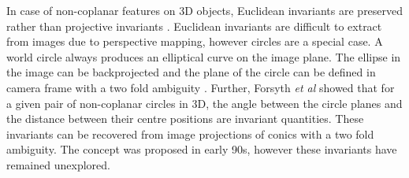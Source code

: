 \documentclass{bmvc2k}
\def\etal{\emph{et al}\bmvaOneDot}
\begin{document}
\par 
In case of non-coplanar features on 3D objects, Euclidean invariants are preserved rather than projective invariants \cite{forsyth_91}.
Euclidean invariants are difficult to extract from images due to perspective mapping, however circles are a special case.   
A world circle always produces an elliptical curve on the image plane. 
The ellipse in the image can be backprojected and the plane of the circle can be defined in camera frame with a two fold ambiguity \cite{forsyth_91,safaee-rad_three-dimensional_1992}. 
Further, Forsyth \etal \cite{forsyth_91} showed that for a given pair of non-coplanar circles in 3D, the angle between the circle planes and the distance between their centre positions are invariant quantities.
These invariants can be recovered from image projections of conics with a two fold ambiguity. 
The concept was proposed in early 90s, however these invariants have remained unexplored.
\end{document}

